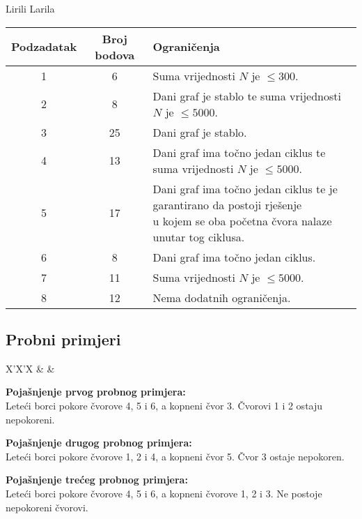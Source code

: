 \begin{statement}[
  problempoints=100,
  timelimit=3 sekunde,
  memorylimit=512 MiB,
]{Lirili Larila}
{\renewcommand{\arraystretch}{1.4}
  \setlength{\tabcolsep}{6pt}
  \begin{tabular}{ccl}
   Podzadatak & Broj bodova & Ograničenja \\ \midrule
    1 & 6 & Suma vrijednosti $N$ je $\leq 300$. \\
    2 & 8 & Dani graf je stablo te suma vrijednosti $N$ je $\leq 5000$. \\
    3 & 25 & Dani graf je stablo. \\
    4 & 13 & Dani graf ima točno jedan ciklus te suma vrijednosti $N$ je $\leq 5000$. \\[5pt]
    5 & 17 & \makecell[l]{Dani graf ima točno jedan ciklus te je garantirano da postoji rješenje \\ u kojem se oba početna čvora nalaze unutar tog ciklusa.}  \\[6pt]
    6 & 8 & Dani graf ima točno jedan ciklus. \\
    7 & 11 & Suma vrijednosti $N$ je $\leq 5000$. \\
    8 & 12 & Nema dodatnih ograničenja. \\
\end{tabular}}

\subsection*{Probni primjeri}
\begin{tabularx}{\textwidth}{X'X'X}
 &
 &
\end{tabularx}

\textbf{Pojašnjenje prvog probnog primjera:} \\
Leteći borci pokore čvorove 4, 5 i 6, a kopneni čvor 3. Čvorovi 1 i 2 ostaju nepokoreni. 

\textbf{Pojašnjenje drugog probnog primjera:} \\
Leteći borci pokore čvorove 1, 2 i 4, a kopneni čvor 5. Čvor 3 ostaje nepokoren. 

\textbf{Pojašnjenje trećeg probnog primjera:} \\
Leteći borci pokore čvorove 4, 5 i 6, a kopneni čvorove 1, 2 i 3. Ne postoje nepokoreni čvorovi. 

\end{statement}

